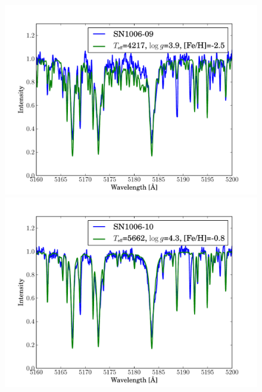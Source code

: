 \begin{figure}[tb]
   \label{fig:sn1006_candfit}
\end{figure}\begin{figure}[tb] %
   \centering
\includegraphics[width=1.1\textwidth, trim=0 0mm 0 10mm, clip]{chapter_sn1006/plots/gold_spectra/sn1006_09.pdf}
\includegraphics[width=1.1\textwidth, trim=0 0mm 0 10mm, clip]{chapter_sn1006/plots/gold_spectra/sn1006_10.pdf}


\end{figure}
